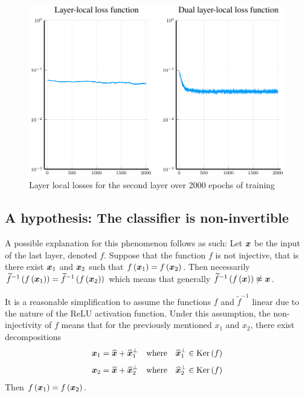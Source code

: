 \begin{figure}
	\centering
	\includegraphics[width=\textwidth]{images/relu-layer2/layer2.pdf}
	\caption{Layer local losses for the second layer over 2000 epochs of training}\label{layer2_losses}
\end{figure}

\subsection{A hypothesis: The classifier is non-invertible}

A possible explanation for this phenomenon follows as such: Let \( \bm{x} \) be the input of the last layer, denoted \( f \). Suppose that the function \( f \) is not injective, that is there exist \( \bm{x}_1 \) and \( \bm{x}_2 \) such that \( f \left( \bm{x}_1 \right) = f \left( \bm{x}_2 \right) \). Then necessarily \( \widetilde{f}^{-1} \left( f \left( \bm{x}_1 \right) \right) = \widetilde{f}^{-1} \left( f \left( \bm{x}_2 \right) \right) \) which means that generally \( \widetilde{f}^{-1} \left( f \left( \bm{x} \right) \right) \not\approx \bm{x} \).

It is a reasonable simplification to assume the functions \( f \) and \( \widetilde{f}^{-1} \) linear due to the nature of the ReLU activation function. Under this assumption, the non-injectivity of \( f \) means that for the previously mentioned \( x_1 \) and \( x_2 \), there exist decompositions
\[ \bm{x}_1 = \widehat{\bm{x}} + \widehat{\bm{x}}_1^\perp \quad \text{where} \quad \widehat{\bm{x}}_1^\perp \in \mathrm{Ker} \left( f \right) \]
\[ \bm{x}_2 = \widehat{\bm{x}} + \widehat{\bm{x}}_2^\perp \quad \text{where} \quad \widehat{\bm{x}}_2^\perp \in \mathrm{Ker} \left( f \right) \]
Then \( f \left( \bm{x}_1 \right) = f \left( \bm{x}_2 \right) \).

